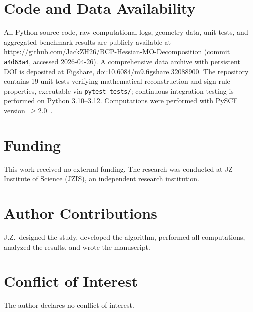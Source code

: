 \documentclass[11pt,a4paper]{article}
\begin{document}
\section*{Code and Data Availability}

All Python source code, raw computational logs, geometry data,
unit tests, and aggregated benchmark results are publicly available
at \url{https://github.com/JackZH26/BCP-Hessian-MO-Decomposition}
(commit \texttt{a4d63a4}, accessed 2026-04-26). A comprehensive
data archive with persistent DOI is deposited at Figshare,
\href{https://doi.org/10.6084/m9.figshare.32088900}{doi:10.6084/m9.figshare.32088900}.
The repository contains 19 unit tests verifying mathematical
reconstruction and sign-rule properties, executable via
\texttt{pytest tests/}; continuous-integration testing is performed
on Python 3.10--3.12. Computations were performed with PySCF
version~$\ge 2.0$~\citep{Sun2018,Sun2020}.

\section*{Funding}

This work received no external funding. The research was conducted
at JZ Institute of Science (JZIS), an independent research
institution.

\section*{Author Contributions}

J.Z.\ designed the study, developed the algorithm, performed all
computations, analyzed the results, and wrote the manuscript.

\section*{Conflict of Interest}

The author declares no conflict of interest.



\end{document}
